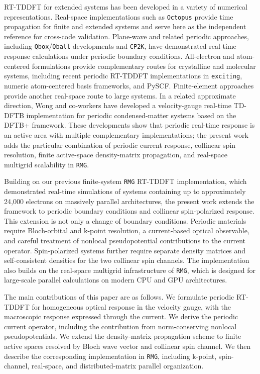 RT-TDDFT for extended systems has been developed in a variety of
numerical representations.  Real-space implementations such as
\texttt{Octopus} provide time propagation for finite and extended
systems and serve here as the independent reference for cross-code
validation.\cite{octopus-2020}  Plane-wave and related periodic
approaches, including \texttt{Qbox}/\texttt{Qball} developments and
\texttt{CP2K}, have demonstrated real-time response calculations under
periodic boundary
conditions.\cite{qball-2017,qball-II-2021,Luber-rt-tddft,cp2k-2020}
All-electron and atom-centered formulations provide complementary
routes for crystalline and molecular systems, including recent periodic
RT-TDDFT implementations in \texttt{exciting}, numeric atom-centered
basis frameworks, and PySCF.\cite{exciting-code-2021,Hekele-2021,Hanasaki-2023}
Finite-element approaches provide another real-space route to large
systems.\cite{gavini-rt-tddft}  In a related approximate direction,
Wong and co-workers have developed a velocity-gauge real-time TD-DFTB
implementation for periodic condensed-matter systems based on the DFTB+
framework.\cite{Xu-Wong-RT-TDDFTB-2023,DFTB+}
These developments show that periodic real-time response is an active
area with multiple complementary implementations; the present work adds
the particular combination of periodic current response, collinear spin
resolution, finite active-space density-matrix propagation, and
real-space multigrid scalability in \texttt{RMG}.

Building on our previous finite-system \texttt{RMG} RT-TDDFT
implementation, which demonstrated real-time simulations of systems
containing up to approximately 24,000 electrons on massively parallel
architectures,\cite{jakowski-rmg-tddft-2025} the present work extends
the framework to periodic boundary conditions and collinear
spin-polarized response.  This extension is not only a change of
boundary conditions.  Periodic materials require Bloch-orbital and
k-point resolution, a current-based optical observable, and careful
treatment of nonlocal pseudopotential contributions to the current
operator.  Spin-polarized systems further require separate density
matrices and self-consistent densities for the two collinear spin
channels.  The implementation also builds on the real-space multigrid
infrastructure of \texttt{RMG}, which is designed for large-scale
parallel calculations on modern CPU and GPU architectures.\cite{rmg-dft-2024}

The main contributions of this paper are as follows.  We formulate
periodic RT-TDDFT for homogeneous optical response in the velocity
gauge, with the macroscopic response expressed through the current.  We
derive the periodic current operator, including the contribution from
norm-conserving nonlocal pseudopotentials.  We extend the density-matrix
propagation scheme to finite active spaces resolved by Bloch wave vector
and collinear spin channel.  We then describe the corresponding
implementation in \texttt{RMG}, including k-point, spin-channel,
real-space, and distributed-matrix parallel organization.

